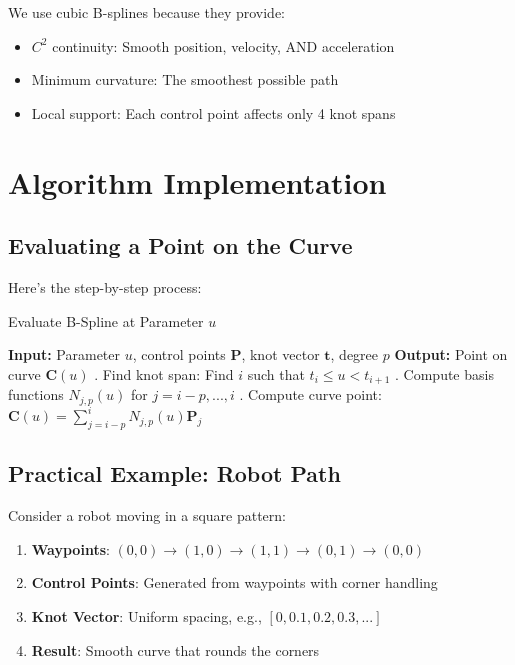 \documentclass[12pt,a4paper]{article}
\begin{document}
We use cubic B-splines because they provide:
\begin{itemize}
    \item $C^2$ continuity: Smooth position, velocity, AND acceleration
    \item Minimum curvature: The smoothest possible path
    \item Local support: Each control point affects only 4 knot spans
\end{itemize}

\section{Algorithm Implementation}

\subsection{Evaluating a Point on the Curve}

Here's the step-by-step process:

\begin{algorithm}
\caption{Evaluate B-Spline at Parameter $u$}
\begin{algorithmic}
\STATE \textbf{Input:} Parameter $u$, control points $\mathbf{P}$, knot vector $\mathbf{t}$, degree $p$
\STATE \textbf{Output:} Point on curve $\mathbf{C}(u)$
\STATE
{}. Find knot span: Find $i$ such that $t_i \leq u < t_{i+1}$
. Compute basis functions $N_{j,p}(u)$ for $j = i-p, ..., i$
. Compute curve point: $\mathbf{C}(u) = \sum_{j=i-p}^{i} N_{j,p}(u) \mathbf{P}_j$
\end{algorithmic}
\end{algorithm}

\subsection{Practical Example: Robot Path}

Consider a robot moving in a square pattern:

\begin{enumerate}
    \item \textbf{Waypoints}: $(0,0) \rightarrow (1,0) \rightarrow (1,1) \rightarrow (0,1) \rightarrow (0,0)$
    \item \textbf{Control Points}: Generated from waypoints with corner handling
    \item \textbf{Knot Vector}: Uniform spacing, e.g., $[0, 0.1, 0.2, 0.3, ...]$
    \item \textbf{Result}: Smooth curve that rounds the corners
\end{enumerate}
\end{document}
